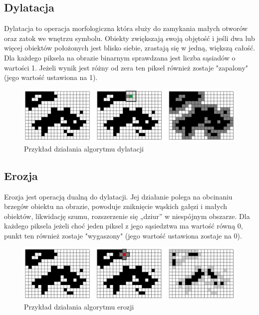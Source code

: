 \documentclass{article}
\begin{document}
\subsection{Dylatacja}
Dylatacja to operacja morfologiczna która służy do zamykania małych otworów oraz zatok we wnętrzu symbolu. Obiekty zwiększają swoją objętość i jeśli dwa lub więcej obiektów położonych jest blisko siebie, zrastają się w jedną, większą całość. Dla każdego piksela na obrazie binarnym sprawdzana jest liczba sąsiadów o wartości 1. Jeżeli wynik jest różny od zera ten piksel również zostaje "zapalony" (jego wartość ustawiona na 1).

\begin{figure}[htp]
	\centering
	\includegraphics[width=1\textwidth]{Figures/dylatacja_przyklad.png}
	\caption{ Przykład działania algorytmu dylatacji }
\end{figure}

\subsection{Erozja}
Erozja jest operacją dualną do dylatacji. Jej działanie polega na obcinaniu brzegów obiektu na obrazie, powoduje zniknięcie wąskich gałęzi i małych obiektów, likwidację szumu, rozszerzenie się „dziur” w niespójnym obszarze. Dla każdego piksela jeżeli choć jeden piksel z jego sąsiedztwa ma wartość równą 0, punkt ten również zostaje "wygaszony" (jego wartość ustawiona zostaje na 0).

\begin{figure}[htp]
	\centering
	\includegraphics[width=1\textwidth]{Figures/erozja_przyklad.png}
	\caption{ Przykład działania algorytmu erozji }
\end{figure}
\end{document}
